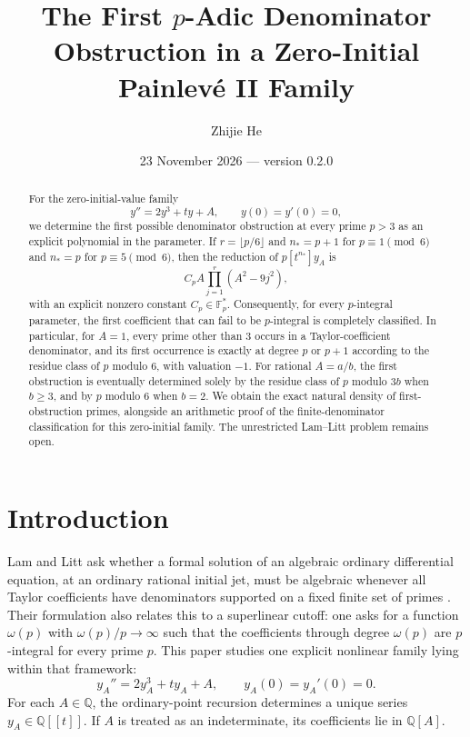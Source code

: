 \documentclass[11pt,a4paper,reqno]{amsart}
\title[First $p$-adic obstructions for a Painlev\'e II family]{The First $p$-Adic Denominator Obstruction in a Zero-Initial Painlev\'e II Family}
\author{Zhijie He}
\date{23 November 2026 --- version 0.2.0}
\theoremstyle{definition}
\theoremstyle{remark}
\newcommand{\Q}{\mathbb Q}
\newcommand{\F}{\mathbb F}
\begin{document}
\begin{abstract}
For the zero-initial-value family
\[
 y''=2y^3+ty+A,\qquad y(0)=y'(0)=0,
\]
we determine the first possible denominator obstruction at every prime $p>3$ as an explicit polynomial in the parameter. If $r=\lfloor p/6\rfloor$ and $n_*=p+1$ for $p\equiv1\pmod 6$ and $n_*=p$ for $p\equiv5\pmod 6$, then the reduction of $p[t^{n_*}]y_A$ is
\[
 C_p A\prod_{j=1}^{r}(A^2-9j^2),
\]
with an explicit nonzero constant $C_p\in\F_p^*$. Consequently, for every $p$-integral parameter, the first coefficient that can fail to be $p$-integral is completely classified. In particular, for $A=1$, every prime other than $3$ occurs in a Taylor-coefficient denominator, and its first occurrence is exactly at degree $p$ or $p+1$ according to the residue class of $p$ modulo $6$, with valuation $-1$. For rational $A=a/b$, the first obstruction is eventually determined solely by the residue class of $p$ modulo $3b$ when $b\ge3$, and by $p$ modulo $6$ when $b=2$. We obtain the exact natural density of first-obstruction primes, alongside an arithmetic proof of the finite-denominator classification for this zero-initial family. The unrestricted Lam--Litt problem remains open.
\end{abstract}

\maketitle

\section{Introduction}

Lam and Litt ask whether a formal solution of an algebraic ordinary differential equation, at an ordinary rational initial jet, must be algebraic whenever all Taylor coefficients have denominators supported on a fixed finite set of primes \cite{LamLitt}. Their formulation also relates this to a superlinear cutoff: one asks for a function $\omega(p)$ with $\omega(p)/p\to\infty$ such that the coefficients through degree $\omega(p)$ are $p$-integral for every prime $p$. This paper studies one explicit nonlinear family lying within that framework:
\begin{equation}\label{eq:PII}
 y_A''=2y_A^3+t y_A+A,\qquad y_A(0)=y_A'(0)=0.
\end{equation}
For each $A\in\Q$, the ordinary-point recursion determines a unique series $y_A\in\Q[[t]]$. If $A$ is treated as an indeterminate, its coefficients lie in $\Q[A]$.
\end{document}
